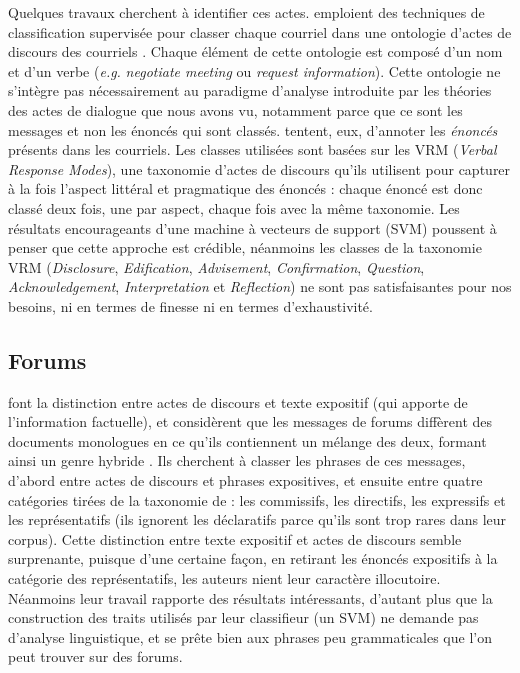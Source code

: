 \documentclass[10pt,a4paper,twoside]{article}
\begin{document}
Quelques travaux cherchent à identifier ces actes. \citet{cohen2004learning} emploient des techniques de classification supervisée pour classer chaque courriel dans une ontologie d'\og actes de discours des courriels \fg. Chaque élément de cette ontologie est composé d'un nom et d'un verbe (\textit{e.g.} \textit{negotiate meeting} ou \textit{request information}). Cette ontologie ne s'intègre pas nécessairement au paradigme d'analyse introduite par les théories des actes de dialogue que nous avons vu, notamment parce que ce sont les messages et non les énoncés qui sont classés. \citet{lampert2006classifying} tentent, eux, d'annoter les \textit{énoncés} présents dans les courriels. Les classes utilisées sont basées sur les VRM (\textit{Verbal Response Modes}), une taxonomie d'actes de discours qu'ils utilisent pour capturer à la fois l'aspect littéral et pragmatique des énoncés : chaque énoncé est donc classé deux fois, une par aspect, chaque fois avec la même taxonomie. Les résultats encourageants d'une machine à vecteurs de support (SVM) poussent \citeauthor{lampert2009segmenting} à penser que cette approche est crédible, néanmoins les classes de la taxonomie VRM (\textit{Disclosure}, \textit{Edification}, \textit{Advisement}, \textit{Confirmation}, \textit{Question}, \textit{Acknowledgement}, \textit{Interpretation} et \textit{Reflection}) ne sont pas satisfaisantes pour nos besoins, ni en termes de finesse ni en termes d'exhaustivité.

\subsection{Forums}
\label{subsec:forums}

\citet{qadir2011classifying} font la distinction entre actes de discours et texte expositif (qui apporte de l'information factuelle), et considèrent que les messages de forums diffèrent des documents monologues en ce qu'ils contiennent un mélange des deux, formant ainsi un genre \og hybride \fg. Ils cherchent à classer les phrases de ces messages, d'abord entre actes de discours et phrases expositives, et ensuite entre quatre catégories tirées de la taxonomie de \citet{searle1976taxonomy} : les commissifs, les directifs, les expressifs et les représentatifs (ils ignorent les déclaratifs parce qu'ils sont trop rares dans leur corpus). Cette distinction entre texte expositif et actes de discours semble surprenante, puisque d'une certaine façon, en retirant les énoncés expositifs à la catégorie des représentatifs, les auteurs nient leur caractère illocutoire. Néanmoins leur travail rapporte des résultats intéressants, d'autant plus que la construction des traits utilisés par leur classifieur (un SVM) ne demande pas d'analyse linguistique, et se prête bien aux phrases peu grammaticales que l'on peut trouver sur des forums.
\end{document}
